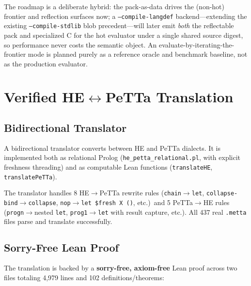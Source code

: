 \documentclass[11pt]{article}
\newcommand{\code}[1]{\texttt{#1}}
\newcommand{\PeTTa}{\textup{PeTTa}}
\newcommand{\HE}{\textup{HE}}
\begin{document}
The roadmap is a deliberate hybrid: the pack-as-data drives the
(non-hot) frontier and reflection surfaces now; a
\code{--compile-langdef} backend---extending the existing
\code{--compile-stdlib} blob precedent---will later emit \emph{both}
the reflectable pack and specialized C for the hot evaluator under a
single shared source digest, so performance never costs the semantic
object.  An evaluate-by-iterating-the-frontier mode is planned purely
as a reference oracle and benchmark baseline, not as the production
evaluator.

\section{Verified \HE{}$\leftrightarrow$\PeTTa{} Translation}

\subsection{Bidirectional Translator}

A bidirectional translator converts between \HE{} and \PeTTa{} dialects.
It is implemented both as relational Prolog
(\code{he\_petta\_relational.pl}, with explicit freshness threading) and
as computable Lean functions (\code{translateHE}, \code{translatePeTTa}).

The translator handles 8 \HE{}$\to$\PeTTa{} rewrite rules
(\code{chain}$\to$\code{let}, \code{collapse-bind}$\to$\code{collapse},
\code{nop}$\to$\code{let~\$fresh~X~()}, etc.)\ and 5
\PeTTa{}$\to$\HE{} rules (\code{progn}$\to$nested \code{let},
\code{prog1}$\to$\code{let} with result capture, etc.).  All 437 real
\code{.metta} files parse and translate successfully.

\subsection{Sorry-Free Lean Proof}

The translation is backed by a \textbf{sorry-free, axiom-free} Lean
proof across two files totaling 4{,}979 lines and 102
definitions/theorems:
\end{document}
